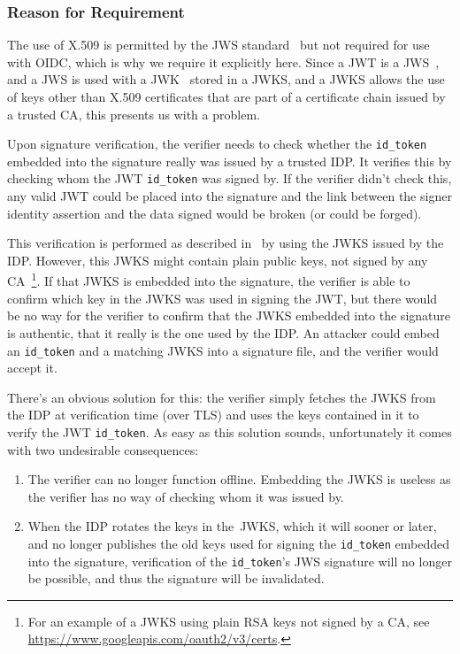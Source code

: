 \subsubsection{Reason for Requirement}
The use of X.509 is permitted by the \gls{JWS} standard~\cite[Section 5.1.6]{rfc7515} but not required for use with \gls{OIDC},
which is why we require it explicitly here.
Since a \gls{JWT} is a \gls{JWS}~\cite[Section 1]{rfc7519},
and a \gls{JWS} is used with a \gls{JWK}~\cite{rfc7517} stored in a \gls{JWKS},
and a \gls{JWKS} allows the use of keys other than X.509 certificates that are part of a certificate chain issued by a trusted \gls{CA},
this presents us with a problem.

Upon signature verification, the verifier needs to check whether the \texttt{id\_token} embedded into the signature really was issued by a trusted \gls{IDP}.
It verifies this by checking whom the \gls{JWT} \texttt{id\_token} was signed by.
If the verifier didn't check this, any valid \gls{JWT} could be placed into the signature and the link between the signer identity assertion and the data signed would be broken (or could be forged).

This verification is performed as described in~\cite[Section 7.2]{rfc7519} by using the \gls{JWKS} issued by the \gls{IDP}.
However, this \gls{JWKS} might contain plain public keys, not signed by any \gls{CA}~\footnote{For an example of a \gls{JWKS} using plain \gls{RSA} keys not signed by a \gls{CA}, see \url{https://www.googleapis.com/oauth2/v3/certs}.}.
If that \gls{JWKS} is embedded into the signature,
the verifier is able to confirm which key in the \gls{JWKS} was used in signing the \gls{JWT},
but there would be no way for the verifier to confirm that the \gls{JWKS} embedded into the signature
is authentic, that it really is the one used by the \gls{IDP}.
An attacker could embed an \texttt{id\_token} and a matching \gls{JWKS} into a signature file,
and the verifier would accept it.

There's an obvious solution for this: the verifier simply fetches the \gls{JWKS} from the \gls{IDP}
at verification time (over \gls{TLS}) and uses the keys contained in it to verify the \gls{JWT} \texttt{id\_token}.
As easy as this solution sounds, unfortunately it comes with two undesirable consequences:
\begin{enumerate}
    \item The verifier can no longer function offline. Embedding the \gls{JWKS} is useless as the verifier has no way of checking whom it was issued by.
    \item When the \gls{IDP} rotates the keys in the~\gls{JWKS}, which it will sooner or later,
    and no longer publishes the old keys used for signing the \texttt{id\_token} embedded into the signature,
    verification of the \texttt{id\_token}'s \gls{JWS} signature
    will no longer be possible, and thus the signature will be invalidated.
\end{enumerate}

